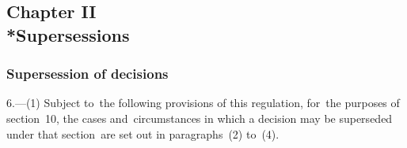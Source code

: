 \documentclass[12pt,a4paper]{article}
\begin{document}
\subsection[Chapter II --- Supersessions]{Chapter II\\*Supersessions}

\subsubsection[6. Supersession of decisions]{Supersession of decisions}

\renewcommand\parthead{--- Part~II Chapter II}

6.—(1) Subject to~the following provisions of this regulation, for~the purposes of section~10, the cases and~circumstances in which a decision may be superseded under that section~are set out in paragraphs~(2) to~(4).
\end{document}
